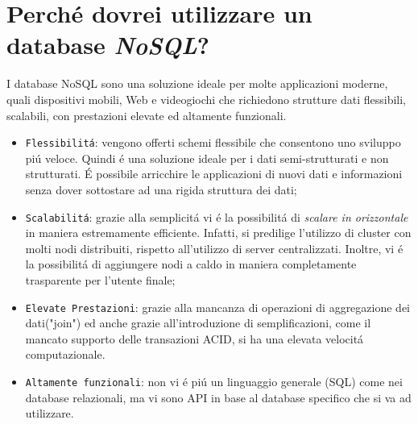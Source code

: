 \section{Perché dovrei utilizzare un database \emph{NoSQL}?}
I database NoSQL sono una soluzione ideale per molte applicazioni moderne, quali dispositivi mobili, Web e videogiochi
che richiedono strutture dati flessibili, scalabili, con prestazioni elevate ed altamente funzionali.
\begin{itemize}
    \item \texttt{Flessibilitá}: vengono offerti schemi flessibile che consentono uno sviluppo piú veloce. Quindi é una soluzione ideale
    per i dati semi-strutturati e non strutturati. É possibile arricchire le applicazioni di nuovi dati e informazioni
    senza dover sottostare ad una rigida struttura dei dati;
    \item \texttt{Scalabilitá}: grazie alla semplicitá vi é la possibilitá di \emph{scalare in orizzontale} in maniera estremamente
    efficiente. Infatti, si predilige l'utilizzo di cluster con molti nodi distribuiti, rispetto all'utilizzo di server centralizzati.
    Inoltre, vi é la possibilitá di aggiungere nodi a caldo in maniera completamente trasparente per l'utente finale;
    \item \texttt{Elevate Prestazioni}: grazie alla mancanza di operazioni di aggregazione dei dati("join") ed anche grazie
    all'introduzione di semplificazioni, come il mancato supporto delle transazioni ACID, si ha una elevata velocitá computazionale.
    \item \texttt{Altamente funzionali}: non vi é piú un linguaggio generale (SQL) come nei database relazionali, ma vi sono
    API in base al database specifico che si va ad utilizzare.
\end{itemize}


